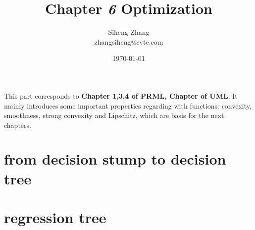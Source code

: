 \documentclass{article}
\author{Siheng Zhang\\zhangsiheng@cvte.com}
\title{Chapter \textbf{\textit{6}} Optimization}
\date{\today}
\begin{document}
\maketitle  

This part corresponds to \textbf{Chapter 1,3,4 of PRML, Chapter of UML}. It mainly introduces some important properties regarding with functions: convexity, smoothness, strong convexity and Lipschitz, which are basis for the next chapters.

\tableofcontents
\newpage

\section{from decision stump to decision tree}
\section{regression tree}

\newpage
\end{document}
